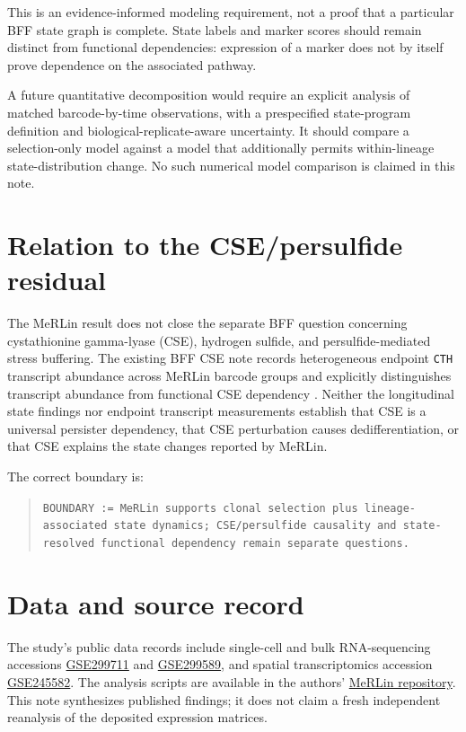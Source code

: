 \documentclass[11pt]{article}
\begin{document}
This is an evidence-informed modeling requirement, not a proof that a particular BFF state graph is complete. State labels and marker scores should remain distinct from functional dependencies: expression of a marker does not by itself prove dependence on the associated pathway.

A future quantitative decomposition would require an explicit analysis of matched barcode-by-time observations, with a prespecified state-program definition and biological-replicate-aware uncertainty. It should compare a selection-only model against a model that additionally permits within-lineage state-distribution change. No such numerical model comparison is claimed in this note.

\section{Relation to the CSE/persulfide residual}

The MeRLin result does not close the separate BFF question concerning cystathionine gamma-lyase (CSE), hydrogen sulfide, and persulfide-mediated stress buffering. The existing BFF CSE note records heterogeneous endpoint \texttt{CTH} transcript abundance across MeRLin barcode groups and explicitly distinguishes transcript abundance from functional CSE dependency \cite{BFFCSE}. Neither the longitudinal state findings nor endpoint transcript measurements establish that CSE is a universal persister dependency, that CSE perturbation causes dedifferentiation, or that CSE explains the state changes reported by MeRLin.

The correct boundary is:
\begin{quote}
\texttt{BOUNDARY := MeRLin supports clonal selection plus lineage-associated state dynamics; CSE/persulfide causality and state-resolved functional dependency remain separate questions.}
\end{quote}

\section{Data and source record}

The study's public data records include single-cell and bulk RNA-sequencing accessions \href{https://www.ncbi.nlm.nih.gov/geo/query/acc.cgi?acc=GSE299711}{GSE299711} and \href{https://www.ncbi.nlm.nih.gov/geo/query/acc.cgi?acc=GSE299589}{GSE299589}, and spatial transcriptomics accession \href{https://www.ncbi.nlm.nih.gov/geo/query/acc.cgi?acc=GSE245582}{GSE245582}. The analysis scripts are available in the authors' \href{https://github.com/Yeqing95/MeRLin}{MeRLin repository}. This note synthesizes published findings; it does not claim a fresh independent reanalysis of the deposited expression matrices.
\end{document}
